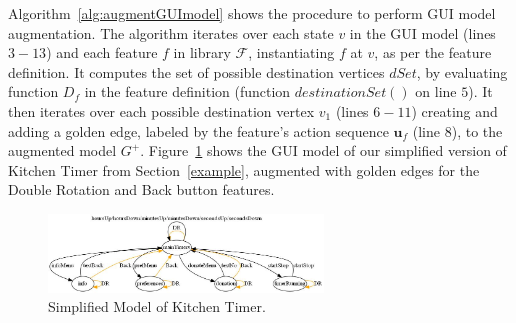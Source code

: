 Algorithm~\ref{alg:augmentGUImodel} shows the procedure to perform GUI model augmentation. The algorithm iterates over each state $v$ in the GUI model (lines $3-13$) and each feature $f$ in library $\mathcal{F}$, instantiating $f$ at $v$, as per the feature definition. It computes the set of possible destination vertices $dSet$, by evaluating function $D_f$ in the feature definition (function $\mathit{destinationSet()}$ on line $5$). It then iterates over each possible destination vertex $v_1$ (lines $6-11$) creating and adding a golden edge, labeled by the feature's action sequence $\mathbf{u}_f$ (line $8$), to the augmented model $G^+$.
Figure~\ref{fig:dotGraph} shows the GUI model of our simplified version of Kitchen Timer from Section~\ref{example}, augmented with golden edges for the Double Rotation and Back button features.

\begin{figure}[!t]
\centering
\includegraphics[width=0.65\textwidth]{figures/dotGraph.jpg}
\caption{Simplified Model of Kitchen Timer.}
\label{fig:dotGraph}
\end{figure}
